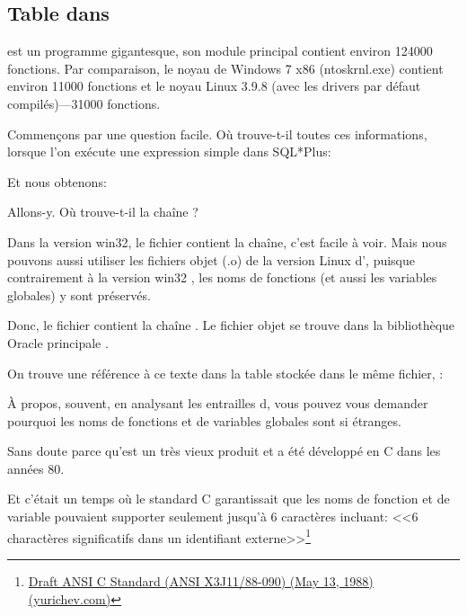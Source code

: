 \subsection{Table  dans \oracle}

\myindex{\oracle}
 est un programme gigantesque, son module principal  contient
environ 124000 fonctions. Par comparaison, le noyau de Windows 7 x86 (ntoskrnl.exe)
contient environ 11000 fonctions et le noyau Linux 3.9.8 (avec les drivers par défaut
compilés)---31000 fonctions.

Commençons par une question facile. Où \oracle trouve-t-il toutes ces informations,
lorsque l'on exécute une expression simple dans SQL*Plus:



Et nous obtenons:



Allons-y. Où \oracle trouve-t-il la chaîne ?

Dans la version win32, le fichier  contient la chaîne, c'est facile
à voir.
Mais nous pouvons aussi utiliser les fichiers objet (.o) de la version Linux d'\oracle,
puisque contrairement à la version win32 , les noms de fonctions (et
aussi les variables globales) y sont préservés.

Donc, le fichier  contient la chaîne .
Le fichier objet se trouve dans la bibliothèque Oracle principale .

On trouve une référence à ce texte dans la table  stockée dans le même
fichier, :



À propos, souvent, en analysant les entrailles d\oracle, vous pouvez vous demander
pourquoi les noms de fonctions et de variables globales sont si étranges.

Sans doute parce qu'\oracle est un très vieux produit et a été développé en C dans
les années 80.

Et c'était un temps où le standard C garantissait que les noms de fonction et de variable
pouvaient supporter seulement jusqu'à 6 caractères incluant: <<6 charactères significatifs
dans un identifiant externe>>\footnote{\href{https://yurichev.com/ref/Draft%20ANSI%20C%20Standard%20(ANSI%20X3J11-88-090)%20(May%2013,%201988).txt}{Draft
ANSI C Standard (ANSI X3J11/88-090) (May 13, 1988) (yurichev.com)}}

